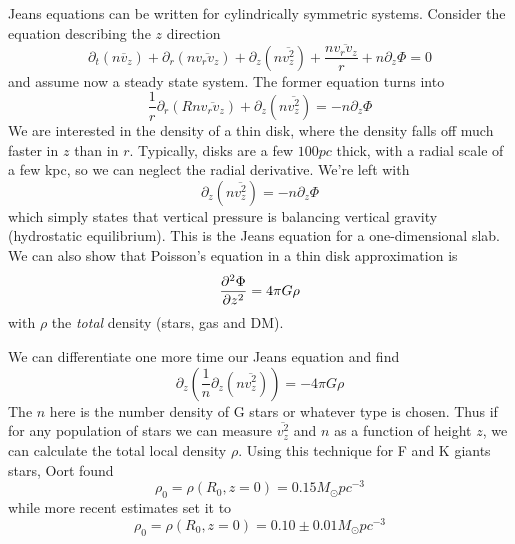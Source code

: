 Jeans equations can be written for cylindrically symmetric systems. Consider the equation describing the $z$ direction
\begin{equation}
    \partial_{t}(n\overline{v}_{z})+\partial_{r}(n\overline{v_{r}v_{z}})+\partial_{z}(n\overline{v_{z}^{2}})+\frac{n\overline{v_{r}v_{z}}}{r} + n\partial_{z}\Phi = 0
    \label{eq:jeans_cylindrical}
\end{equation}
and assume now a steady state system. The former equation turns into
\begin{equation*}
    \frac{1}{r}\partial_{r}(Rn\overline{v_{r}v_{z}})+\partial_{z}(n\overline{v_{z}^{2}}) = - n\partial_{z}\Phi
\end{equation*}
We are interested in the density of a thin disk, where the density falls off much faster in $z$ than in $r$. Typically, disks are a few $100\unit{pc}$ thick, with a radial scale of a few kpc, so we can neglect the radial derivative. We're left with 
\begin{equation*}
    \partial_{z}(n\overline{v_{z}^{2}}) = - n\partial_{z}\Phi
\end{equation*}
which simply states that vertical pressure is balancing vertical gravity (hydrostatic equilibrium). This is the Jeans equation for a one-dimensional slab. We can also show that Poisson's equation in a thin disk approximation is 
\begin{equation*}
    \frac{\partial^{2} \Phi}{\partial z^{2}} = 4\pi G \rho
\end{equation*}
with $\rho$ the \emph{total} density (stars, gas and DM).
\par We can differentiate one more time our Jeans equation and find 
\begin{equation*}
    \partial_{z}\left(\frac{1}{n}\partial_{z}(n\overline{v_{z}^{2}}) \right) = -4\pi G \rho
\end{equation*}
The $n$ here is the number density of G stars or whatever type is chosen. Thus if for any population of stars we can measure $\overline{v_{z}^{2}}$ and $n$ as a function of height $z$, we can calculate the total local density $\rho$. Using this technique for F and K giants stars, Oort found
\begin{equation*}
    \rho_{0} = \rho(R_{0}, z=0) = 0.15M_{\odot}\unit{pc}^{-3}
\end{equation*}
while more recent estimates set it to
\begin{equation}
    \rho_{0} = \rho(R_{0}, z=0) = 0.10 \pm 0.01M_{\odot}\unit{pc}^{-3}
    \label{eq:oortlimit}
\end{equation}
